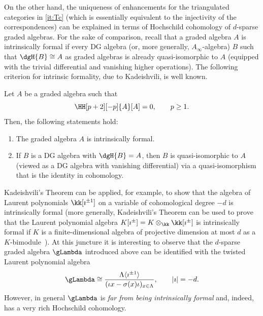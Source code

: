 \documentclass[a4paper]{amsart}
\begin{document}
On the other hand, the uniqueness of enhancements for the triangulated
categories in \eqref{it:Tc} (which is
essentially equivalent to the injectivity of the correspondences) can be
explained in terms of Hochschild cohomology of $d$-sparse graded algebras. For
the sake of comparison, recall that a graded algebra $A$ is intrinsically formal
if every DG algebra (or, more generally, $A_\infty$-algebra) $B$ such that
$\dgH{B}\cong A$ as graded algebras is already quasi-isomorphic to $A$ (equipped
with the trivial differential and vanishing higher operations). The following
criterion for intrinsic formality, due to Kadeishvili, is well known.

\begin{theorem*}
  Let $A$ be a graded algebra such that
  \[
    \HH[p+2][-p]{A}[A]=0,\qquad p\geq1.
  \]
  Then, the following statements hold:
  \begin{enumerate}
  \item The graded algebra $A$ is intrinsically formal.
  \item If $B$ is a DG algebra with $\dgH{B}=A$, then $B$ is quasi-isomorphic to
    $A$ (viewed as a DG algebra with vanishing differential) via a
    quasi-isomorphism that is the identity in cohomology.
  \end{enumerate}
\end{theorem*}
Kadeishvili's Theorem can be applied, for example, to show that the algebra of
Laurent polynomials $\kk[\imath^{\pm1}]$ on a variable of cohomological degree
$-d$ is intrinsically formal (more generally, Kadeishvili's Theorem can be used
to prove that the Laurent polynomial algebra
$K[\imath^{\pm}]=K\otimes_\kk\kk[\imath^{\pm}]$ is intrinsically formal if $K$ is
a finite-dimensional algebra of projective dimension at most $d$ as a
$K$-bimodule~\cite[Cor.~4.2]{Sai20}). At this juncture it is interesting to
observe that the $d$-sparse graded algebra $\gLambda$ introduced above can be
identified with the twisted Laurent polynomial algebra
\[
  \gLambda\cong\frac{\Lambda\langle\imath^{\pm1}\rangle}{(\iota
  x-\sigma(x)\iota)_{x\in\Lambda}},\qquad |\imath|=-d.
\]
However, in general $\gLambda$ is \emph{far from being intrinsically formal} and, indeed, has a
very rich Hochschild cohomology.
\end{document}
